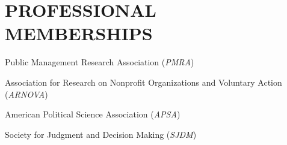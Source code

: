 \documentclass[letterpaper]{article}
\renewenvironment{itemize}{
  \begin{list}{}{
    \setlength{\leftmargin}{1.5em}
  }
}{
  \end{list}
}
\begin{document}
\section*{PROFESSIONAL MEMBERSHIPS}
\begin{itemize}
	
\item Public Management Research Association ({\it PMRA})
	
\item Association for Research on Nonprofit Organizations and Voluntary Action ({\it ARNOVA})

\item American Political Science Association ({\it APSA})

\item Society for Judgment and Decision Making ({\it SJDM})

\end{itemize}

\bigskip

\end{document}
